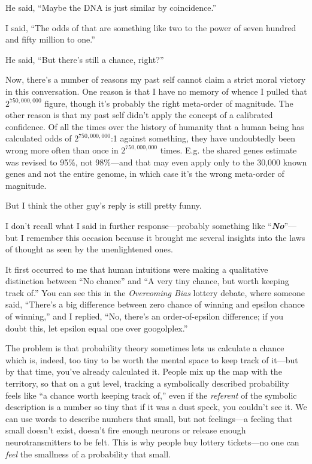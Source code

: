 {
 He said, ``Maybe the DNA is just similar by
coincidence.''}

{
 I said, ``The odds of that are something like two
to the power of seven hundred and fifty million to
one.''}

{
 He said, ``But there's still a
chance, right?''}

{
 Now, there's a number of reasons my past self
cannot claim a strict moral victory in this conversation. One reason is
that I have no memory of whence I pulled that
$2^{750,000,000}$ figure, though it's
probably the right meta-order of magnitude. The other reason is that my
past self didn't apply the concept of a calibrated
confidence. Of all the times over the history of humanity that a human
being has calculated odds of $2^{750,000,000}$:1 against
something, they have undoubtedly been wrong more often than once in
$2^{750,000,000}$ times. E.g. the shared genes estimate
was revised to 95\%, not 98\%---and that may even apply only to the
30,000 known genes and not the entire genome, in which case
it's the wrong meta-order of magnitude.}

{
 But I think the other guy's reply is still pretty
funny.}

{
 I don't recall what I said in further
response---probably something like
``\textbf{\textit{No}}''---but I
remember this occasion because it brought me several insights into the
laws of thought as seen by the unenlightened ones.}

{
 It first occurred to me that human intuitions were making a
qualitative distinction between ``No
chance'' and ``A very tiny chance,
but worth keeping track of.'' You can see this in the
\textit{Overcoming Bias} lottery debate, where someone said,
``There's a big difference between
zero chance of winning and epsilon chance of
winning,'' and I replied, ``No,
there's an order-of-epsilon difference; if you doubt
this, let epsilon equal one over googolplex.''}

{
 The problem is that probability theory sometimes lets us calculate
a chance which is, indeed, too tiny to be worth the mental space to
keep track of it---but by that time, you've already
calculated it. People mix up the map with the territory, so that on a
gut level, tracking a symbolically described probability feels like
``a chance worth keeping track of,''
even if the \textit{referent} of the symbolic description is a number
so tiny that if it was a dust speck, you couldn't see
it. We can use words to describe numbers that small, but not
feelings---a feeling that small doesn't exist,
doesn't fire enough neurons or release enough
neurotransmitters to be felt. This is why people buy lottery
tickets---no one can \textit{feel} the smallness of a probability that
small.}

